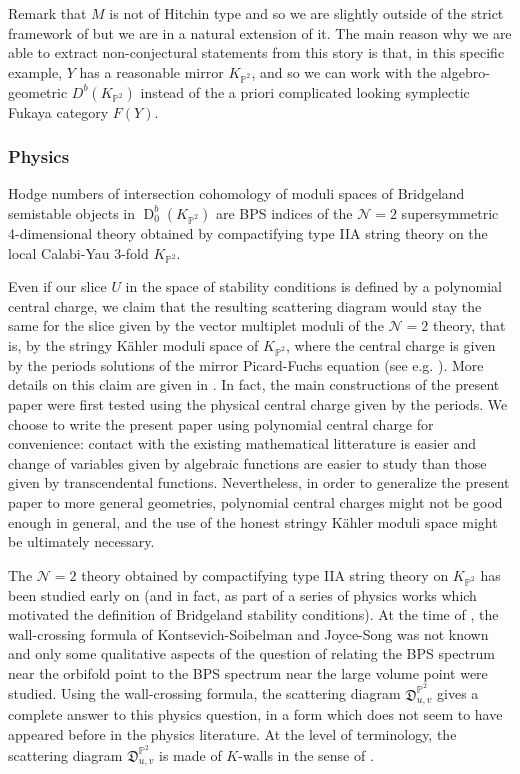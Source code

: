 \documentclass[12pt, a4paper]{amsart}
\newcommand\PP{\mathbb P}
\newcommand\fD{\mathfrak D}
\newcommand\D{\operatorname{D}}
\begin{document}
Remark that $M$
is not of Hitchin type and so we are slightly outside of the strict framework of 
\cite{MR3330788} but we are in a natural extension of it. The main reason why we are able to extract non-conjectural statements from this story is that, in this specific example, $Y$ has a reasonable mirror $K_{\PP^2}$, and so we can work with the algebro-geometric $D^b(K_{\PP^2})$ instead of the a priori complicated looking symplectic Fukaya category $F(Y)$.

\subsubsection{Physics}
\label{section_physics}
Hodge numbers of intersection cohomology of 
moduli spaces of Bridgeland semistable objects in $\D^b_0(K_{\PP^2})$ are BPS indices of the $\mathcal{N}=2$ supersymmetric 4-dimensional theory obtained by compactifying 
type IIA string theory on the local Calabi-Yau 3-fold $K_{\PP^2}$. 

Even if our slice $U$ in the space of stability conditions is defined by a polynomial
central charge, we claim that the resulting scattering diagram would stay the same for the slice given by the vector multiplet moduli of the $\mathcal{N}=2$ theory, that is, by the stringy K\"ahler moduli space of $K_{\PP^2}$,
where the central charge is given by the periods solutions of the mirror Picard-Fuchs equation
(see e.g. \cite[\S 9]{MR2852118}). More details on this claim are given in 
\cite[\S 3.4]{bousseau2019takahashi}. In fact, the main constructions of the present paper were first tested using the physical central charge given by the periods. 
We choose to write the present paper using polynomial
central charge for convenience: contact with the existing mathematical litterature is easier and change of variables given by algebraic functions are easier to study than those given by transcendental functions. Nevertheless, in order to generalize the present paper to more general geometries, polynomial central charges might not be good enough in general, and the use of the honest stringy Kähler moduli space might be ultimately necessary.

The $\mathcal{N}=2$ theory obtained by compactifying type IIA string theory on 
$K_{\PP^2}$ has been studied early on \cite{MR2174156} (and in fact, as part of a series of physics works which motivated the definition of Bridgeland stability conditions). At the time of \cite{MR2174156}, the wall-crossing formula of Kontsevich-Soibelman and Joyce-Song was not known and only some qualitative aspects of the question of relating the BPS spectrum near the orbifold point to the BPS spectrum near the large volume point were studied. 
Using the wall-crossing formula, the scattering diagram $\fD^{\PP^2}_{u,v}$
gives a complete answer to this physics question, in a form which does not seem to have appeared before in the physics literature. 
At the level of terminology, the scattering diagram $\fD^{\PP^2}_{u,v}$ is made of $K$-walls in the sense of \cite{MR3115984}.
\end{document}
